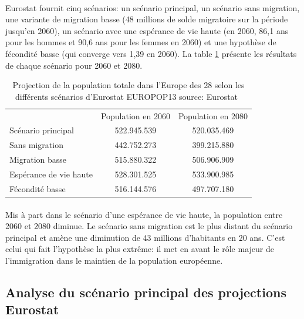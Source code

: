 \paragraph{}Eurostat fournit cinq scénarios: un scénario principal, un scénario sans migration, une variante de migration basse (48 millions de solde migratoire sur la période jusqu’en 2060),  un scénario avec une espérance de vie haute (en 2060, 86,1 ans pour les hommes et 90,6 ans pour les femmes en 2060) et une hypothèse de fécondité basse (qui converge vers 1,39 en 2060). La table \ref{projection_scenario} présente les résultats de chaque scénario pour 2060 et 2080.

\begin{table}
  \caption{Projection de la population totale dans l'Europe des 28 selon les différents scénarios d'Eurostat EUROPOP13 source: Eurostat~\citep{eurostat_europop13}}
  \label{projection_scenario}

  \begin{center}
    \begin{tabular}{lcc}
       & Population en 2060 & Population en 2080\\
      Scénario principal & 522.945.539 & 520.035.469\\
      Sans migration & 442.752.273 & 399.215.880 \\
      Migration basse & 515.880.322 & 506.906.909 \\
      Espérance de vie haute & 528.301.525 & 533.900.985 \\
      Fécondité basse & 516.144.576 & 497.707.180 \\
    \end{tabular}
  \end{center}
\end{table}

\paragraph{}Mis à part dans le scénario d’une espérance de vie haute, la population entre 2060 et 2080 diminue. Le scénario sans migration est le plus distant du scénario principal et amène une diminution de 43 millions d’habitants en 20 ans. C’est celui qui fait l’hypothèse la plus extrême: il met en avant le rôle majeur de l’immigration dans le maintien de la population européenne.


\subsection{Analyse du scénario principal des projections Eurostat}
